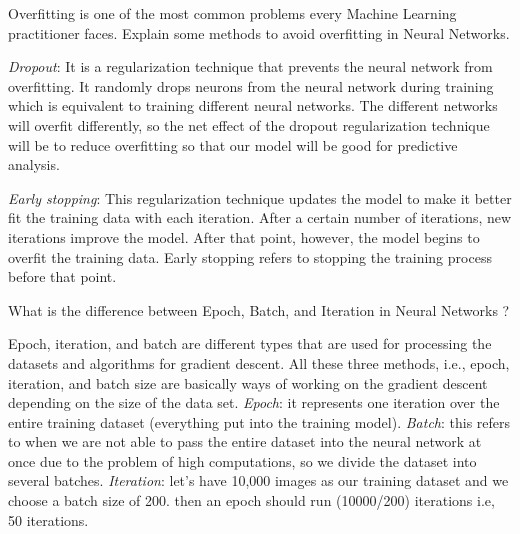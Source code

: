\documentclass[12pt,a4paper]{exam}
\begin{document}
\question
Overfitting is one of the most common problems every Machine Learning practitioner faces. Explain some methods to avoid overfitting in Neural Networks.
\fillwithlines{3cm}
\begin{solution}
\emph{Dropout}: It is a regularization technique that prevents the neural network from overfitting. It randomly drops neurons from the neural network during training which is equivalent to training different neural networks. The different networks will overfit differently, so the net effect of the dropout regularization technique will be to reduce overfitting so that our model will be good for predictive analysis.

\emph{Early stopping}: This regularization technique updates the model to make it better fit the training data with each iteration. After a certain number of iterations, new iterations improve the model. After that point, however, the model begins to overfit the training data. Early stopping refers to stopping the training process before that point.
\end{solution}

\question
What is the difference between Epoch, Batch, and Iteration in Neural Networks ?
\fillwithlines{3cm}
\begin{solution}
Epoch, iteration, and batch are different types that are used for processing the datasets and algorithms for gradient descent. All these three methods, i.e., epoch, iteration, and batch size are basically ways of working on the gradient descent depending on the size of the data set.
\emph{Epoch}: it represents one iteration over the entire training dataset (everything put into the training model).
\emph{Batch}: this refers to when we are not able to pass the entire dataset into the neural network at once due to the problem of high computations, so we divide the dataset into several batches.
\emph{Iteration}: let’s have 10,000 images as our training dataset and we choose a batch size of 200. then an epoch should run (10000/200) iterations i.e, 50 iterations.
\end{solution}
\end{document}
